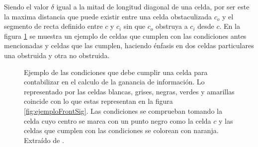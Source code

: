 Siendo el valor $\delta$ igual a la mitad de longitud diagonal de una celda, por ser este la maxima distancia que puede existir entre una celda obstaculizada $c_o$ y el segmento de recta definido entre $c$ y $c_i$ sin que $c_o$ obstruya a $c_i$ desde $c$. En la figura \ref{fig:ejemploOclusionAm} se muestra un ejemplo de celdas que cumplen con las condiciones antes mencionadas y celdas que las cumplen, haciendo énfasis en dos celdas particulares una obstruida y otra no obstruida.

\begin{figure}[H]
  \centering
  \qquad

  \caption{Ejemplo de las condiciones que debe cumplir una celda para contabilizar en el calculo de la ganancia de información. Lo representado por las celdas blancas, grises, negras, verdes y amarillas coincide con lo que estas representan en la figura \ref{fig:ejemploFrontSig}. Las condiciones se comprueban tomando la celda cuyo centro se marca con un punto negro como la celda $c$ y las celdas que cumplen con las condiciones se colorean con naranja. Extraído de \cite{Amorin2019}.}\label{fig:ejemploOclusionAm}
\end{figure}



